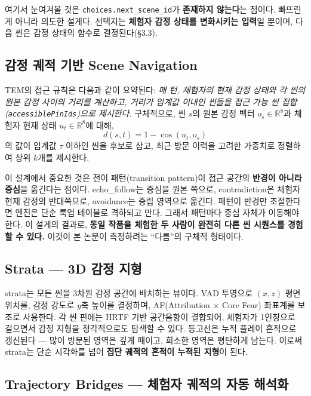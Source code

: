 \documentclass[11pt, a4paper]{article}
\begin{document}
여기서 눈여겨볼 것은 \texttt{choices.next\_scene\_id}가 \textbf{존재하지 않는다}는 점이다. 빠뜨린 게 아니라 의도한 설계다. 선택지는 \textbf{체험자 감정 상태를 변화시키는 입력}일 뿐이며, 다음 씬은 감정 상태의 함수로 결정된다(\S3.3).

\subsection{감정 궤적 기반 Scene Navigation}

TEM의 접근 규칙은 다음과 같이 요약된다: \textit{매 턴, 체험자의 현재 감정 상태와 각 씬의 원본 감정 사이의 거리를 계산하고, 거리가 임계값 이내인 씬들을 접근 가능 씬 집합(\texttt{accessiblePinIds})으로 제시한다.} 구체적으로, 씬 $s$의 원본 감정 벡터 $o_s \in \mathbb{R}^8$과 체험자 현재 상태 $u_t \in \mathbb{R}^8$에 대해,
\begin{equation}
d(s, t) = 1 - \cos(u_t, o_s)
\end{equation}
의 값이 임계값 $\tau$ 이하인 씬을 후보로 삼고, 최근 방문 이력을 고려한 가중치로 정렬하여 상위 $k$개를 제시한다.

이 설계에서 중요한 것은 전이 패턴(transition pattern)이 접근 공간의 \textbf{반경이 아니라 중심}을 옮긴다는 점이다. echo\_follow는 중심을 원본 쪽으로, contradiction은 체험자 현재 감정의 반대쪽으로, avoidance는 중립 영역으로 옮긴다. 패턴이 반경만 조절한다면 엔진은 단순 룩업 테이블로 격하되고 만다. 그래서 패턴마다 중심 자체가 이동해야 한다. 이 설계의 결과로, \textbf{동일 작품을 체험한 두 사람이 완전히 다른 씬 시퀀스를 경험할 수 있다.} 이것이 본 논문이 측정하려는 ``다름''의 구체적 형태이다.

\subsection{Strata --- 3D 감정 지형}

strata는 모든 씬을 3차원 감정 공간에 배치하는 뷰이다. VAD 투영으로 $(x, z)$ 평면 위치를, 감정 강도로 $y$축 높이를 결정하며, AF(Attribution $\times$ Core Fear) 좌표계를 보조로 사용한다. 각 씬 핀에는 HRTF 기반 공간음향이 결합되어, 체험자가 1인칭으로 걸으면서 감정 지형을 청각적으로도 탐색할 수 있다. 등고선은 누적 플레이 흔적으로 갱신된다 --- 많이 방문된 영역은 깊게 패이고, 희소한 영역은 평탄하게 남는다. 이로써 strata는 단순 시각화를 넘어 \textbf{집단 궤적의 흔적이 누적된 지형}이 된다.

\subsection{Trajectory Bridges --- 체험자 궤적의 자동 해석화}
\end{document}
